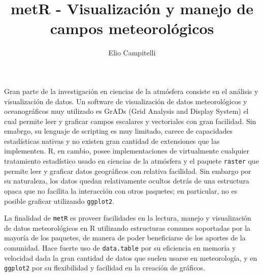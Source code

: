 \documentclass[runningheads]{llncs}\usepackage{knitr}
\begin{document}
\title{metR - Visualización y manejo de campos meteorológicos}

%
\author{Elio Campitelli}

%
%
%
\maketitle              %
%




Gran parte de la investigación en ciencias de la atmósfera consiste en el análisis y visualización de datos. Un software de visualización de datos meteorológicos y oceanográficos muy utilizado es GrADs (Grid Analysis and Display System) el cual permite leer y graficar campos escalares y vectoriales con gran facilidad. Sin emabrgo, su lenguaje de scripting es muy limitado, carece de capacidades estadísticas nativas y no existen gran cantidad de extensiones que las implementen. R, en cambio, posee implementaciones de virtualmente cualquier tratamiento estadístico usado en ciencias de la atmósfera y el paquete \texttt{raster} que permite leer y graficar datos geográficos con relativa facilidad. Sin embargo por su naturaleza, los datos quedan relativamente ocultos detrás de una estructura opaca que no facilita la interacción con otros paquetes; en particular, no es posible graficar utilizando \texttt{ggplot2}. 

La finalidad de \texttt{metR} es proveer facilidades en la lectura, manejo y visualización de datos meteorológicos en R utilizando estructuras comunes soportadas por la mayoría de los paquetes, de manera de poder beneficiarse de los aportes de la comunidad. Hace fuerte uso de \texttt{data.table} por su eficiencia en memoria y velocidad dada la gran cantidad de datos que suelen usarse en meteorología, y en \texttt{ggplot2} por su flexibilidad y facilidad en la creación de gráficos. 
\end{document}
